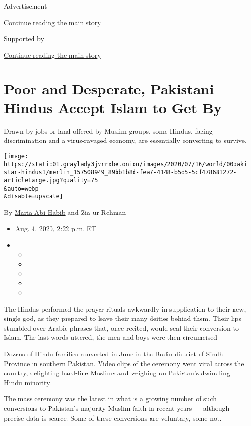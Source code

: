 Advertisement

\protect\hyperlink{after-top}{Continue reading the main story}

Supported by

\protect\hyperlink{after-sponsor}{Continue reading the main story}

\hypertarget{poor-and-desperate-pakistani-hindus-accept-islam-to-get-by}{%
\section{Poor and Desperate, Pakistani Hindus Accept Islam to Get
By}\label{poor-and-desperate-pakistani-hindus-accept-islam-to-get-by}}

Drawn by jobs or land offered by Muslim groups, some Hindus, facing
discrimination and a virus-ravaged economy, are essentially converting
to survive.

\texttt{[image: https://static01.graylady3jvrrxbe.onion/images/2020/07/16/world/00pakistan-hindus1/merlin\_157508949\_89bb1b8d-fea7-4148-b5d5-5cf478681272-articleLarge.jpg?quality=75\\\&auto=webp\\\&disable=upscale]}

By \href{https://www.nytimes3xbfgragh.onion/by/maria-abi-habib}{Maria
Abi-Habib} and Zia ur-Rehman

\begin{itemize}
\item
  Aug. 4, 2020, 2:22 p.m. ET
\item
  \begin{itemize}
  \item
  \item
  \item
  \item
  \item
  \end{itemize}
\end{itemize}

The Hindus performed the prayer rituals awkwardly in supplication to
their new, single god, as they prepared to leave their many deities
behind them. Their lips stumbled over Arabic phrases that, once recited,
would seal their conversion to Islam. The last words uttered, the men
and boys were then circumcised.

Dozens of Hindu families converted in June in the Badin district of
Sindh Province in southern Pakistan. Video clips of the ceremony went
viral across the country, delighting hard-line Muslims and weighing on
Pakistan's dwindling Hindu minority.

The mass ceremony was the latest in what is a growing number of such
conversions to Pakistan's majority Muslim faith in recent years ---
although precise data is scarce. Some of these conversions are
voluntary, some not.

